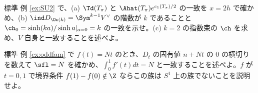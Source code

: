 \begin{prob}{標準}\label{p:SU2sphere}
例 \ref{ex:SU2} で、(a) $\Td(T_\pi)$ と $\Ahat(T_\pi)e^{c_1(T_\pi)/2}$ の一致を $x=2h$ で確かめ、(b) $\ind D_{\Oc(k)}=\Sym^{k-1}V^\vee$ の階数が $k$ であることと $\ch_0=\sinh(ka)/\sinh a|_{a=0}=k$ の一致を示せ。(c) $k=2$ の指数束の $\ch$ を求め、$V$ 自身と一致することを述べよ。
\end{prob}
\begin{prob}{標準}\label{p:oddfam}
例 \ref{ex:oddfam} で $f(t)=Nt$ のとき、$D_t$ の固有値 $n+Nt$ の $0$ の横切りを数えて $\sfl=N$ を確かめ、$\int_0^1f'(t)dt=N$ と一致することを述べよ。$f$ が $t=0,1$ で境界条件 $f(1)-f(0)\notin\Z$ ならこの族は $S^1$ 上の族でないことを説明せよ。
\end{prob}
